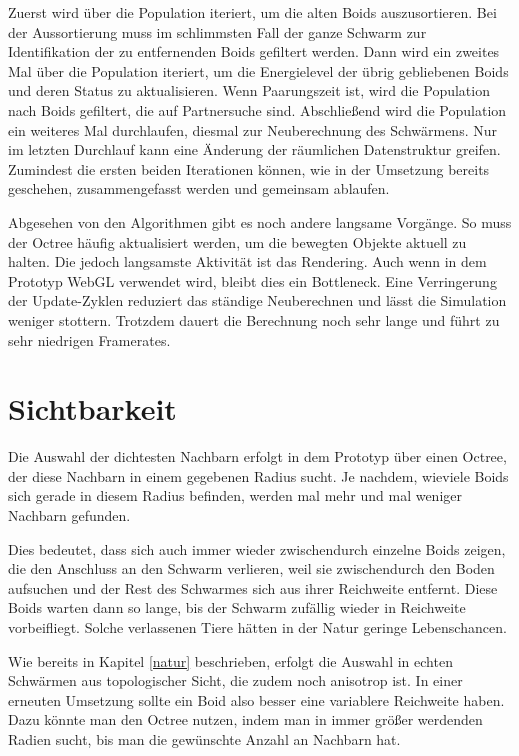 \documentclass[draft=false
              ,paper=a4
              ,twoside=false
              ,fontsize=11pt
              ,headsepline
              ,BCOR10mm
              ,DIV11
              ,bibtotoc
              ,liststotoc
              ]{scrbook}
\begin{document}
Zuerst wird über die Population iteriert, um die alten Boids auszusortieren. Bei der Aussortierung muss im schlimmsten Fall der ganze Schwarm zur Identifikation der zu entfernenden Boids gefiltert werden. Dann wird ein zweites Mal über die Population iteriert, um die Energielevel der übrig gebliebenen Boids und deren Status zu aktualisieren. Wenn Paarungszeit ist, wird die Population nach Boids gefiltert, die auf Partnersuche sind. Abschließend wird die Population ein weiteres Mal durchlaufen, diesmal zur Neuberechnung des Schwärmens. Nur im letzten Durchlauf kann eine Änderung der räumlichen Datenstruktur greifen. Zumindest die ersten beiden Iterationen können, wie in der Umsetzung bereits geschehen, zusammengefasst werden und gemeinsam ablaufen.

Abgesehen von den Algorithmen gibt es noch andere langsame Vorgänge. So muss der Octree häufig aktualisiert werden, um die bewegten Objekte aktuell zu halten. Die jedoch langsamste Aktivität ist das Rendering. Auch wenn in dem Prototyp WebGL verwendet wird, bleibt dies ein Bottleneck. Eine Verringerung der Update-Zyklen reduziert das ständige Neuberechnen und lässt die Simulation weniger stottern. Trotzdem dauert die Berechnung noch sehr lange und führt zu sehr niedrigen Framerates.

\section{Sichtbarkeit}
Die Auswahl der dichtesten Nachbarn erfolgt in dem Prototyp über einen Octree, der diese Nachbarn in einem gegebenen Radius sucht. Je nachdem, wieviele Boids sich gerade in diesem Radius befinden, werden mal mehr und mal weniger Nachbarn gefunden.

Dies bedeutet, dass sich auch immer wieder zwischendurch einzelne Boids zeigen, die den Anschluss an den Schwarm verlieren, weil sie zwischendurch den Boden aufsuchen und der Rest des Schwarmes sich aus ihrer Reichweite entfernt. Diese Boids warten dann so lange, bis der Schwarm zufällig wieder in Reichweite vorbeifliegt. Solche verlassenen Tiere hätten in der Natur geringe Lebenschancen.

Wie bereits in Kapitel \ref{natur} beschrieben, erfolgt die Auswahl in echten Schwärmen aus topologischer Sicht, die zudem noch anisotrop ist. In einer erneuten Umsetzung sollte ein Boid also besser eine variablere Reichweite haben. Dazu könnte man den Octree nutzen, indem man in immer größer werdenden Radien sucht, bis man die gewünschte Anzahl an Nachbarn hat.
\end{document}
